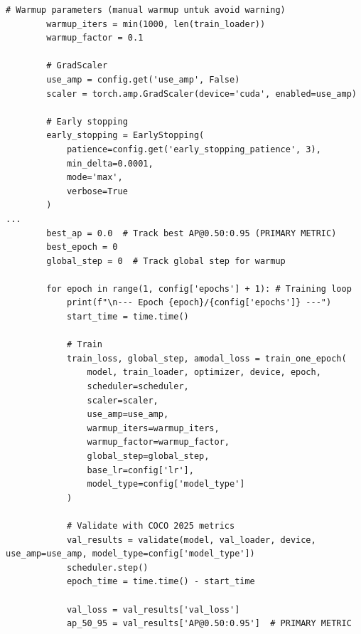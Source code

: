 \begin{lstlisting}[caption={Proses Pelatihan Model dengan \textit{K-Fold Cross-Validation}}, label={code:4.train_kfold}]
        # Warmup parameters (manual warmup untuk avoid warning)
        warmup_iters = min(1000, len(train_loader))
        warmup_factor = 0.1
        
        # GradScaler
        use_amp = config.get('use_amp', False)
        scaler = torch.amp.GradScaler(device='cuda', enabled=use_amp)
        
        # Early stopping
        early_stopping = EarlyStopping(
            patience=config.get('early_stopping_patience', 3),
            min_delta=0.0001,
            mode='max',
            verbose=True
        )
...
        best_ap = 0.0  # Track best AP@0.50:0.95 (PRIMARY METRIC)
        best_epoch = 0
        global_step = 0  # Track global step for warmup
        
        for epoch in range(1, config['epochs'] + 1): # Training loop
            print(f"\n--- Epoch {epoch}/{config['epochs']} ---")
            start_time = time.time()

            # Train
            train_loss, global_step, amodal_loss = train_one_epoch(
                model, train_loader, optimizer, device, epoch,
                scheduler=scheduler,
                scaler=scaler,
                use_amp=use_amp,
                warmup_iters=warmup_iters,
                warmup_factor=warmup_factor,
                global_step=global_step,
                base_lr=config['lr'],
                model_type=config['model_type']
            )
            
            # Validate with COCO 2025 metrics
            val_results = validate(model, val_loader, device, use_amp=use_amp, model_type=config['model_type'])
            scheduler.step()
            epoch_time = time.time() - start_time

            val_loss = val_results['val_loss']
            ap_50_95 = val_results['AP@0.50:0.95']  # PRIMARY METRIC      
\end{lstlisting}

